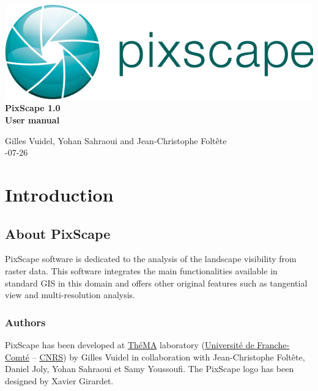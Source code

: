 \documentclass{report}
\begin{document}
 \begin{titlepage}
	
	\centering
	\includegraphics[scale=0.5]{img/logo.png}\\
	
	\bigskip
	\bigskip
	\bigskip	
	{\Huge
		\bfseries
		PixScape 1.0\\
		\bigskip
		User manual\\
	}
	\bigskip
	\bigskip
	\bigskip
	\bigskip
	\bigskip
	
	{\Large		
		Gilles Vuidel, Yohan Sahraoui and Jean-Christophe Foltête\\
		-07-26\\
	}
	
\end{titlepage}

\setcounter{tocdepth}{2}
\tableofcontents

\pagebreak

\chapter{Introduction}

\section{About PixScape}

PixScape software is dedicated to the analysis of the landscape visibility from raster data.
This software integrates the main functionalities available in standard GIS  in this domain and offers other original features such as tangential view and multi-resolution analysis.


\subsection{Authors}
PixScape has been developed at \href{http://thema.univ-fcomte.fr}{ThéMA} laboratory (\href{http://www.univ-fcomte.fr}{Université de Franche-Comté} – \href{http://www.cnrs.fr}{CNRS}) by Gilles Vuidel in collaboration with Jean-Christophe Foltête, Daniel Joly, Yohan Sahraoui et Samy Youssoufi. The PixScape logo has been designed by Xavier Girardet.
\end{document}
